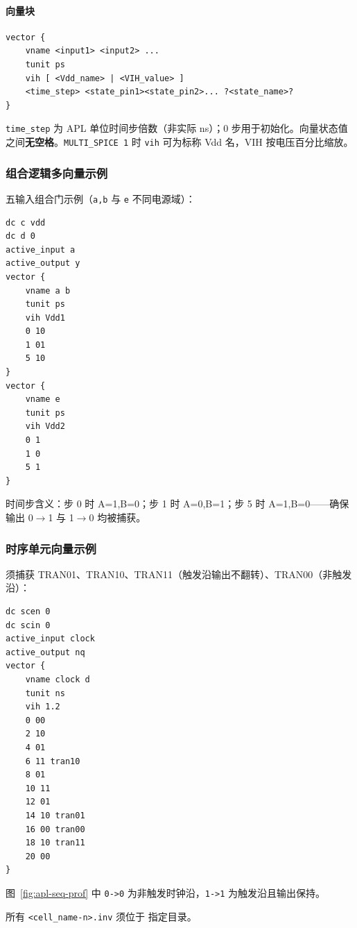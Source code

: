 \paragraph{向量块}
\begin{lstlisting}
vector {
    vname <input1> <input2> ...
    tunit ps
    vih [ <Vdd_name> | <VIH_value> ]
    <time_step> <state_pin1><state_pin2>... ?<state_name>?
}
\end{lstlisting}
\texttt{time\_step} 为 APL 单位时间步倍数（非实际 ns）；0 步用于初始化。向量状态值之间\textbf{无空格}。\texttt{MULTI\_SPICE 1} 时 \texttt{vih} 可为标称 Vdd 名，VIH 按电压百分比缩放。

\subsubsection{组合逻辑多向量示例}
五输入组合门示例（\texttt{a,b} 与 \texttt{e} 不同电源域）：
\begin{lstlisting}
dc c vdd
dc d 0
active_input a
active_output y
vector {
    vname a b
    tunit ps
    vih Vdd1
    0 10
    1 01
    5 10
}
vector {
    vname e
    tunit ps
    vih Vdd2
    0 1
    1 0
    5 1
}
\end{lstlisting}
时间步含义：步 0 时 A=1,B=0；步 1 时 A=0,B=1；步 5 时 A=1,B=0——确保输出 0$\rightarrow$1 与 1$\rightarrow$0 均被捕获。


\subsubsection{时序单元向量示例}
须捕获 TRAN01、TRAN10、TRAN11（触发沿输出不翻转）、TRAN00（非触发沿）：
\begin{lstlisting}
dc scen 0
dc scin 0
active_input clock
active_output nq
vector {
    vname clock d
    tunit ns
    vih 1.2
    0 00
    2 10
    4 01
    6 11 tran10
    8 01
    10 11
    12 01
    14 10 tran01
    16 00 tran00
    18 10 tran11
    20 00
}
\end{lstlisting}


图~\ref{fig:apl-seq-prof} 中 \texttt{0->0} 为非触发时钟沿，\texttt{1->1} 为触发沿且输出保持。

\begin{noteBox}
所有 \texttt{<cell\_name-n>.inv} 须位于  指定目录。
\end{noteBox}



